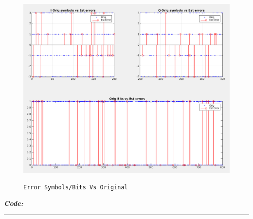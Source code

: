 \documentclass[11pt]{article}
\begin{document}
    \begin{figure}[H]
        \centering
        \includegraphics[scale=0.5, width=\textwidth]{img/A13_A15_errors.png} \\
        \caption{\texttt{Error Symbols/Bits Vs Original}}
    \end{figure}
    
    
%
%
%
\newpage

\textbf{\emph{Code:}} \\
\rule{\linewidth}{0.3mm} \\[0.1cm]
\end{document}

